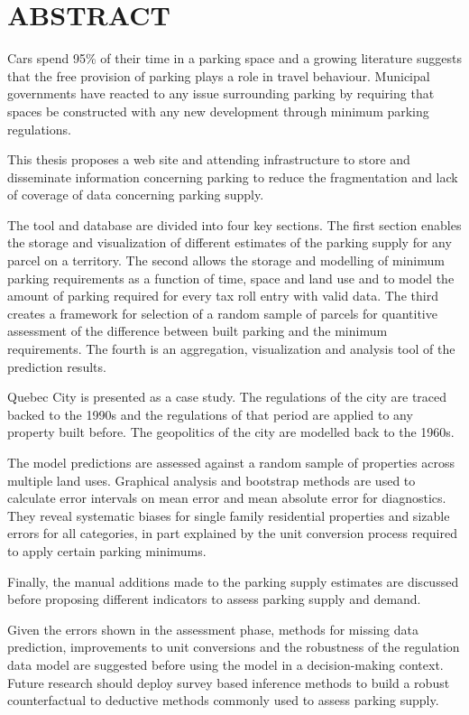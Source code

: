 %
\chapter*{ABSTRACT}\thispagestyle{headings}

Cars spend 95\% of their time in a parking space and a growing literature suggests that the free provision of parking plays a role in travel behaviour. Municipal governments have reacted to any issue surrounding parking by requiring that spaces be constructed with any new development through minimum parking regulations.\par
This thesis proposes a web site and attending infrastructure to store and disseminate information concerning parking to reduce the fragmentation and lack of coverage of data concerning parking supply.\par
The tool and database are divided into four key sections. The first section enables the storage and visualization of different estimates of the parking supply for any parcel on a territory. The second allows the storage and modelling of minimum parking requirements as a function of time, space and land use and to model the amount of parking required for every tax roll entry with valid data. The third creates a framework for selection of a random sample of parcels for quantitive assessment of the difference between built parking and the minimum requirements.  The fourth is an aggregation, visualization and analysis tool of the prediction results.

Quebec City is presented as a case study. The regulations of the city are traced backed to the 1990s and the regulations of that period are applied to any property built before. The geopolitics of the city are modelled back to the 1960s.\par

The model predictions are assessed against a random sample of properties across multiple land uses. Graphical analysis and bootstrap methods are used to calculate error intervals on mean error and mean absolute error for diagnostics. They reveal systematic biases for single family residential properties and sizable errors for all categories, in part explained by the unit conversion process required to apply certain parking minimums.

Finally, the manual additions made to the parking supply estimates are discussed before proposing different indicators to assess parking supply and demand.

Given the errors shown in the assessment phase, methods for missing data prediction, improvements to unit conversions and the robustness of the regulation data model are suggested before using the model in a decision-making context. Future research should deploy survey based inference methods to build a robust counterfactual to deductive methods commonly used to assess parking supply.